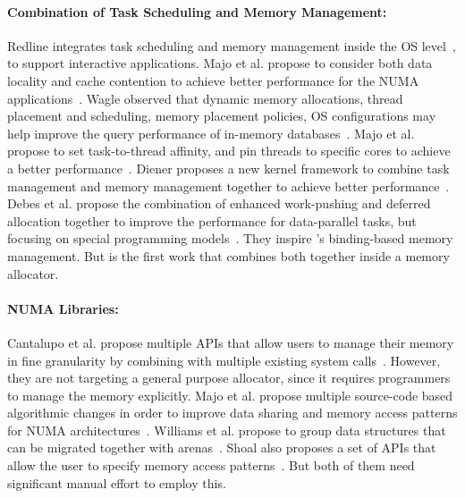 \paragraph{Combination of Task Scheduling and Memory Management:} Redline integrates task scheduling and memory management inside the OS level~\cite{Redline}, to support interactive applications. 
Majo et al. propose to consider both data locality and cache contention to achieve better performance for the NUMA applications~\cite{Majo:2011:MMN:1993478.1993481}. Wagle observed that dynamic memory allocations, thread placement and scheduling, memory placement policies, OS configurations may help improve the query performance of in-memory databases~\cite{wagle2015numa}.  Majo et al. propose to set task-to-thread affinity, and pin threads to specific cores to achieve a better performance~\cite{Majo:2015:LPC:2688500.2688509}. Diener proposes a new kernel framework to combine task management and memory management together to achieve better performance~\cite{diener2015automatic}. 
Debes et al. propose the combination of enhanced work-pushing and deferred allocation together to improve the performance for data-parallel tasks, but focusing on special programming models~\cite{DBLP:conf/IEEEpact/DrebesPH0D16}. They inspire \NM{}'s binding-based memory management. But \NM{} is the first work that combines both together inside a memory allocator. 



\paragraph{NUMA Libraries:}
Cantalupo et al. propose multiple APIs that allow users to manage their memory in fine granularity by combining with multiple existing system calls~\cite{cantalupo2015memkind}. However, they are not targeting a general purpose allocator, since it requires programmers to manage the memory explicitly.  Majo et al. propose multiple source-code based  algorithmic changes in order to improve data sharing and memory access patterns for NUMA architectures~\cite{6704666}. Williams et al. propose to group data structures that can be migrated together with arenas~\cite{WilliamsI0L18}. 
Shoal also proposes a set of APIs that allow the user to specify memory access patterns~\cite{Kaestle:2015:SSA:2813767.2813787}. 
But both of them need significant manual effort to employ this. 

